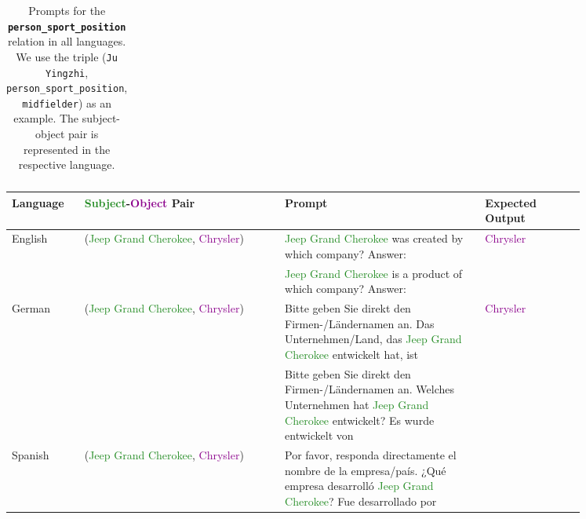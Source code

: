 \begin{table*}[htbp]
\begin{center}
\begin{tabular}{m{0.10\linewidth} p{0.30\linewidth} p{0.30\linewidth} m{0.15\linewidth}}
    & \\
\bottomrule
\end{tabular}
\end{center}
\caption{Prompts for the \textbf{\texttt{person\_sport\_position}} relation in all languages. We use the triple (\texttt{Ju Yingzhi}, \texttt{person\_sport\_position}, \texttt{midfielder}) as an example. The subject-object pair is represented in the respective language.}
\label{tab:prompts_person_sport_position}
\end{table*}


\begin{table*}[htbp]
\scriptsize
\centering
\setlength{\tabcolsep}{1.0mm}{}
\begin{center}
\begin{tabular}{m{0.10\linewidth} p{0.30\linewidth} p{0.30\linewidth} m{0.15\linewidth}}
\textbf{Language} & \textbf{\textcolor{forestgreen}{Subject}-\textcolor{darkmagenta}{Object} Pair} & \textbf{Prompt} & \textbf{Expected Output} \\
\toprule
\multirow{2}{*}{\centering English} 
  & \multirow{2}{*}{\raggedright (\textcolor{forestgreen}{Jeep Grand Cherokee}, \textcolor{darkmagenta}{Chrysler})} 
  & \textcolor{forestgreen}{Jeep Grand Cherokee} was created by which company? \newline Answer:
  & \multirow{2}{*}{\centering \textcolor{darkmagenta}{Chrysler}} \\
  & 
  & \textcolor{forestgreen}{Jeep Grand Cherokee} is a product of which company? \newline Answer:
  & \\
\midrule
\multirow{2}{*}{\centering German} 
  & \multirow{2}{*}{\raggedright (\textcolor{forestgreen}{Jeep Grand Cherokee}, \textcolor{darkmagenta}{Chrysler})} 
  & Bitte geben Sie direkt den Firmen-/Ländernamen an. Das Unternehmen/Land, das \textcolor{forestgreen}{Jeep Grand Cherokee} entwickelt hat, ist
  & \multirow{2}{*}{\centering \textcolor{darkmagenta}{Chrysler}} \\
  & 
  & Bitte geben Sie direkt den Firmen-/Ländernamen an. Welches Unternehmen hat \textcolor{forestgreen}{Jeep Grand Cherokee} entwickelt? Es wurde entwickelt von
  & \\
\midrule
\multirow{2}{*}{\centering Spanish} 
  & \multirow{2}{*}{\raggedright (\textcolor{forestgreen}{Jeep Grand Cherokee}, \textcolor{darkmagenta}{Chrysler})} 
  & Por favor, responda directamente el nombre de la empresa/país. ¿Qué empresa desarrolló \textcolor{forestgreen}{Jeep Grand Cherokee}? Fue desarrollado por

\end{tabular}
\end{center}
\end{table*}
